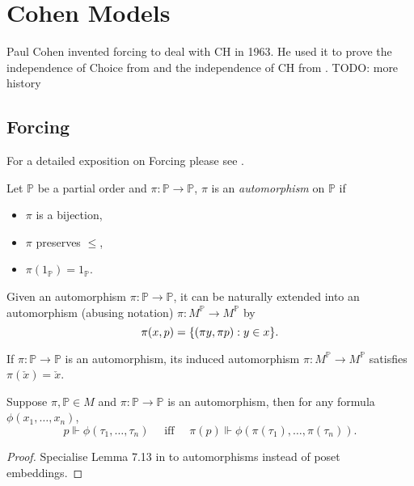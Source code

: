 \chapter{Cohen Models}

Paul Cohen invented forcing to deal with CH in 1963.
He used it to prove the independence of Choice from \ZF and the independence of CH from \ZFC.
TODO: more history

\section{Forcing}
\renewcommand*{\P}{{\mathbb{P}}}
\newcommand*{\forces}{\Vdash}

For a detailed exposition on Forcing please see \autocite{kunen1980}.

\begin{definition}
    Let \(\P\) be a partial order and \(\pi: \P\to\P\),
    \(\pi\) is an \emph{automorphism} on \(\P\) if
    \begin{itemize}
        \item \(\pi\) is a bijection,
        \item \(\pi\) preserves \(\leq\),
        \item \(\pi(1_{\P}) = 1_\P\).
    \end{itemize}
\end{definition}

\begin{definition} \label{defn:extend_automorphism_to_names}
    Given an automorphism \(\pi:\P\to\P\),
    it can be naturally extended into an automorphism (abusing notation) \(\pi: M^{\mathbb{P}} \to M^{\mathbb{P}}\) by
    \[ \pi(x,p) = {\left\{ (\pi y , \pi p ): y\in x \right\}}. \]
\end{definition}

\begin{observation}
    If \(\pi:\P\to\P\) is an automorphism, its induced automorphism \(\pi: M^\P \to M^\P\) satisfies \(\pi(\check{x}) = \check{x}\).
\end{observation}

\begin{lemma}
    Suppose \(\pi, \P\in M\) and \(\pi:\P\to\P\) is an automorphism, then for any formula \(\phi(x_1,\dots,x_n)\),
    \[ p\forces \phi(\tau_1,\dots,\tau_n)\quad \text{ iff }\quad \pi(p)\forces \phi(\pi(\tau_1),\dots,\pi(\tau_n)).  \]
\end{lemma}
\begin{proof}
    Specialise Lemma 7.13 in \autocite[222]{kunen1980} to automorphisms instead of poset embeddings.
\end{proof}

